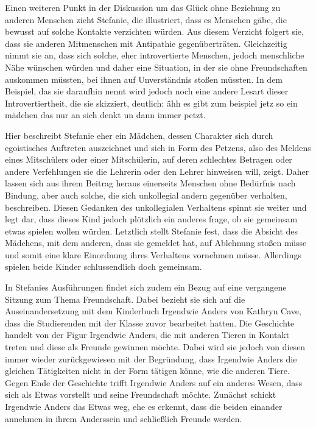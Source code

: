 Einen weiteren Punkt in der Diskussion um das Glück ohne Beziehung zu anderen Menschen zieht Stefanie, die illustriert, dass es Menschen gäbe, die bewusst auf solche Kontakte verzichten würden. 
Aus diesem Verzicht folgert sie, dass sie anderen Mitmenschen mit Antipathie gegenüberträten. 
Gleichzeitig nimmt sie an, dass sich solche, eher introvertierte Menschen, jedoch menschliche Nähe wünschen würden und daher eine  Situation, in der sie ohne Freundschaften auskommen müssten, bei ihnen auf Unverständnis stoßen müssten.
In dem Beispiel, das sie daraufhin nennt wird jedoch noch eine andere Lesart dieser Introvertiertheit, die sie skizziert, deutlich: \glqq ähh es gibt zum beispiel jetz so ein mädchen das nur an sich denkt un dann immer petzt.\grqq{}

Hier beschreibt Stefanie eher ein Mädchen, dessen Charakter sich durch egoistisches Auftreten auszeichnet und sich in Form des \glqq Petzens\grqq{}, also des Meldens eines Mitschülers oder einer Mitschülerin, auf deren schlechtes Betragen oder andere Verfehlungen sie die Lehrerin oder den Lehrer hinweisen will, zeigt. 
Daher lassen sich aus ihrem Beitrag heraus einerseits Menschen ohne Bedürfnis nach Bindung, aber auch solche, die sich unkollegial andern gegenüber verhalten, beschreiben. 
Diesen Gedanken des unkollegialen Verhaltens spinnt sie weiter und legt dar, dass dieses Kind jedoch plötzlich ein anderes frage, ob sie gemeinsam etwas spielen wollen würden. 
Letztlich stellt Stefanie fest, dass die Absicht des Mädchens, mit dem anderen, dass sie gemeldet hat, auf Ablehnung stoßen müsse und somit eine klare Einordnung ihres Verhaltens vornehmen müsse. 
Allerdings spielen beide Kinder schlussendlich doch gemeinsam. 

In Stefanies Ausführungen findet sich zudem ein Bezug auf eine vergangene Sitzung zum Thema \glqq Freundschaft\grqq{}. 
Dabei bezieht sie sich auf die Auseinandersetzung mit dem Kinderbuch \glqq Irgendwie Anders\grqq{} von Kathryn Cave, dass die Studierenden mit der Klasse zuvor bearbeitet hatten. 
Die Geschichte handelt von der Figur \glqq Irgendwie Anders\grqq{}, die mit anderen Tieren in Kontakt treten und diese als Freunde gewinnen möchte. 
Dabei wird sie jedoch von diesen immer wieder zurückgewiesen mit der Begründung, dass Irgendwie Anders die gleichen Tätigkeiten nicht in der Form tätigen könne, wie die anderen Tiere. 
Gegen Ende der Geschichte trifft Irgendwie Anders auf ein anderes Wesen, dass sich als \glqq Etwas\grqq{} vorstellt und seine Freundschaft möchte. 
Zunächst schickt Irgendwie Anders das Etwas weg, ehe es erkennt, dass die beiden einander annehmen in ihrem Anderssein und schließlich Freunde werden.

